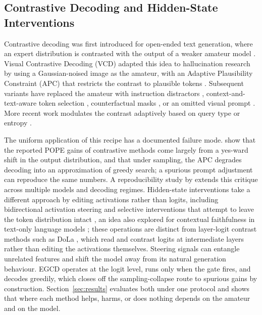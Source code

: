 \documentclass[pdflatex,sn-basic,Numbered]{sn-jnl}
\theoremstyle{thmstyleone}
\theoremstyle{thmstyletwo}
\theoremstyle{thmstylethree}
\begin{document}
\subsection{Contrastive Decoding and Hidden-State Interventions}\label{subsec:contrastive}

Contrastive decoding was first introduced for open-ended text generation, where an expert distribution is contrasted with the output of a weaker amateur model \cite{li2023acontrastive,su2022empirical}. Visual Contrastive Decoding (VCD) adapted this idea to hallucination research by using a Gaussian-noised image as the amateur, with an Adaptive Plausibility Constraint (APC) that restricts the contrast to plausible tokens \cite{leng2024mitigating}. Subsequent variants have replaced the amateur with instruction distractors \cite{wang2024mitigating}, context-and-text-aware token selection \cite{huo2025self}, counterfactual masks \cite{xiao2026macd}, or an omitted visual prompt \cite{favero2024multi}. More recent work modulates the contrast adaptively based on query type or entropy \cite{im2025selfaug,huang2026chasd}.

The uniform application of this recipe has a documented failure mode. \cite{yin2025mirage} show that the reported POPE gains of contrastive methods come largely from a yes-ward shift in the output distribution, and that under sampling, the APC degrades decoding into an approximation of greedy search; a spurious prompt adjustment can reproduce the same numbers. A reproducibility study by \cite{bendre2026rethinking} extends this critique across multiple models and decoding regimes. Hidden-state interventions take a different approach by editing activations rather than logits, including bidirectional activation steering \cite{su2025activation} and selective interventions that attempt to leave the token distribution intact \cite{zhang2026mitigating}, an idea also explored for contextual faithfulness in text-only language models \cite{wang2025contextfocus}; these operations are distinct from layer-logit contrast methods such as DoLa \cite{chuang2024dola}, which read and contrast logits at intermediate layers rather than editing the activations themselves. Steering signals can entangle unrelated features and shift the model away from its natural generation behaviour. EGCD operates at the logit level, runs only when the gate fires, and decodes greedily, which closes off the sampling-collapse route to spurious gains by construction. Section~\ref{sec:results} evaluates both under one protocol and shows that where each method helps, harms, or does nothing depends on the amateur and on the model.
\end{document}

